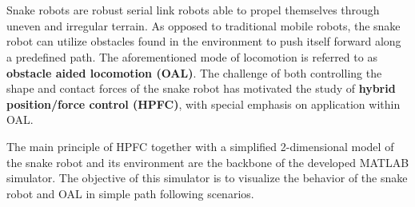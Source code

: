 \chapter{\abstractname}




Snake robots are robust serial link robots able to propel themselves through uneven and irregular terrain. As opposed to traditional mobile robots, the snake robot can utilize obstacles found in the environment to push itself forward along a predefined path. The aforementioned mode of locomotion is referred to as \textbf{obstacle aided locomotion (OAL)}. The challenge of both controlling the shape and contact forces of the snake robot has motivated the study of \textbf{hybrid position/force control (HPFC)}, with special emphasis on application within OAL.




The main principle of HPFC together with a simplified 2-dimensional model of the snake robot and its environment are the backbone of the developed MATLAB simulator. The objective of this simulator is to visualize the behavior of the snake robot and OAL in simple path following scenarios.


